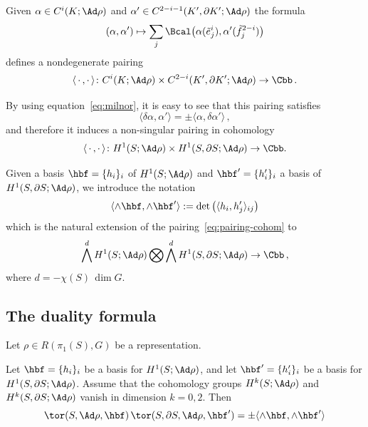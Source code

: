 Given $\alpha\in C^i(K;\Ad\rho) $ and $\alpha'\in C^{2-i-1}(K',\partial K';\Ad\rho) $ the formula
\[
(\alpha,\alpha') \mapsto \sum_{j}
\Bcal\big(\alpha(\tilde{e}^i_j), \alpha'(\tilde{f}^{2-i}_j) \big)
\]
defines a nondegenerate pairing
\begin{equation}\label{eqn:intersectionchains}
\langle\,\cdot\,,\cdot\,\rangle\colon C^i(K;\Ad\rho)\times C^{2-i}(K',\partial K';\Ad\rho) \to \Cbb\,.
\end{equation}

By using equation~\eqref{eq:milnor}, it is easy to see that this pairing satisfies
\begin{equation}\label{eqn:intersectionboundary}
\langle \delta \alpha, \alpha'\rangle = \pm \langle \alpha, \delta \alpha'\rangle\,,
\end{equation}
and therefore it induces a non-singular pairing in cohomology
\begin{equation}\label{eq:pairing-cohom}
\langle\,\cdot\,,\cdot\,\rangle\colon H^1(S;\Ad\rho)\times H^{1}(S,\partial S;\Ad\rho) \to \Cbb.\\
\end{equation}

Given a basis ${\hbf}=\{ h_i\}_i $ of $ H^1(S;\Ad\rho) $ and ${\hbf}'=\{ h_i'\}_i $ a basis of $ H^1(S,\partial S;\Ad\rho) $, we introduce the notation
\begin{equation}
\langle \wedge{\hbf}, \wedge{\hbf} '\rangle := \det\big(\langle h_i, h_j' \rangle_{ij} \big)
\end{equation}
which is the natural extension of the pairing~\eqref{eq:pairing-cohom} to
\[
\bigwedge^d H^1(S;\Ad\rho) \bigotimes
\bigwedge^d H^1(S,\partial S;\Ad\rho) \to\Cbb\,,
\]
where $d=-\chi(S)\,\dim G$.

\subsection{The duality formula}
Let $\rho\in R(\pi_1(S),G)$ be a representation.
\begin{prop}\label{Proposition:duality}
Let ${\hbf}=\{ h_i\}_i $ be a basis for $ H^1(S;\Ad\rho) $, and let ${\hbf}'=\{ h_i'\}_i $ be a basis for $ H^1(S,\partial S;\Ad\rho) $. Assume that the cohomology groups $H^k(S;\Ad\rho)$ and $H^k(S,\partial S;\Ad\rho)$ vanish in dimension $k=0, 2$. Then
\[
\tor(S,\Ad\rho, {\hbf}) \,
\tor(S,\partial S,\Ad\rho, {\hbf}') =
\pm \langle \wedge {\hbf}, \wedge {\hbf} ' \rangle
\]
\end{prop}


